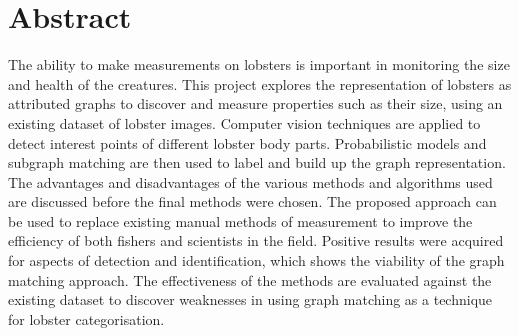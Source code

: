 \section*{Abstract}
The ability to make measurements on lobsters is important in monitoring the size and health of the creatures.
This project explores the representation of lobsters as attributed graphs to discover and measure properties such as their size, using an existing dataset of lobster images.
Computer vision techniques are applied to detect interest points of different lobster body parts. 
Probabilistic models and subgraph matching are then used to label and build up the graph representation.
The advantages and disadvantages of the various methods and algorithms used are discussed before the final methods were chosen. 
The proposed approach can be used to replace existing manual methods of measurement to improve the efficiency of both fishers and scientists in the field. 
Positive results were acquired for aspects of detection and identification, which shows the viability of the graph matching approach.
The effectiveness of the methods are evaluated against the existing dataset to discover weaknesses in using graph matching as a technique for lobster categorisation. 


